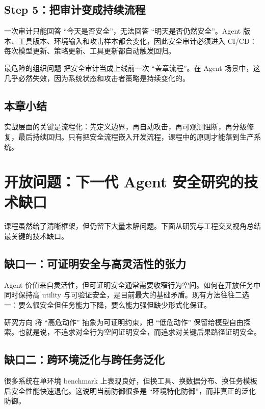 \documentclass[a4paper]{article}
\begin{document}
\subsection{Step 5：把审计变成持续流程}
一次审计只能回答 ``今天是否安全''，无法回答 ``明天是否仍然安全''。Agent 版本、工具版本、环境输入和攻击样本都会变化，因此安全审计必须进入 CI/CD：每次模型更新、策略更新、工具更新都自动触发回归。

\begin{warningbox}{最危险的组织问题}
把安全审计当成上线前一次 ``盖章流程''。在 Agent 场景中，这几乎必然失效，因为系统状态和攻击者策略是持续变化的。
\end{warningbox}

\subsection{本章小结}
实战层面的关键是流程化：先定义边界，再自动攻击，再可观测阻断，再分级修复，最后持续回归。只有把安全流程嵌入开发流程，课程中的原则才能落到生产系统。

\section{开放问题：下一代 Agent 安全研究的技术缺口}

课程虽然给了清晰框架，但仍留下大量未解问题。下面从研究与工程交叉视角总结最关键的技术缺口。

\subsection{缺口一：可证明安全与高灵活性的张力}
Agent 价值来自灵活性，但可证明安全通常需要收窄行为空间。如何在开放任务中同时保持高 utility 与可验证安全，是目前最大的基础矛盾。现有方法往往二选一：要么很安全但任务能力下降，要么能力强但缺少形式化保证。

\begin{importantbox}{研究方向}
将 ``高危动作'' 抽象为可证明约束，把 ``低危动作'' 保留给模型自由探索。也就是说，不追求对全行为空间证明安全，而追求对关键后果路径证明安全。
\end{importantbox}

\subsection{缺口二：跨环境泛化与跨任务泛化}
很多系统在单环境 benchmark 上表现良好，但换工具、换数据分布、换任务模板后安全性能快速退化。这说明当前防御很多是 ``环境特化防御''，而非真正的泛化防御。
\end{document}
